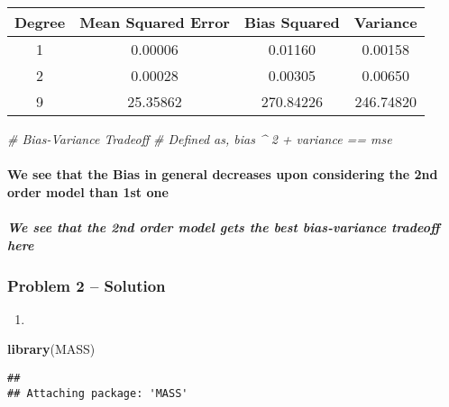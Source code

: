 \documentclass[]{article}
\newenvironment{Shaded}{\begin{snugshade}}{\end{snugshade}}
\newcommand{\CommentTok}[1]{\textcolor[rgb]{0.56,0.35,0.01}{\textit{#1}}}
\newcommand{\KeywordTok}[1]{\textcolor[rgb]{0.13,0.29,0.53}{\textbf{#1}}}
\newcommand{\NormalTok}[1]{#1}
\let\oldparagraph\paragraph
\renewcommand{\paragraph}[1]{\oldparagraph{#1}\mbox{}}
\let\oldsubparagraph\subparagraph
\renewcommand{\subparagraph}[1]{\oldsubparagraph{#1}\mbox{}}
\begin{document}
\begin{longtable}[]{@{}cccc@{}}
\toprule
Degree & Mean Squared Error & Bias Squared & Variance\tabularnewline
\midrule
\endhead
1 & 0.00006 & 0.01160 & 0.00158\tabularnewline
2 & 0.00028 & 0.00305 & 0.00650\tabularnewline
9 & 25.35862 & 270.84226 & 246.74820\tabularnewline
\bottomrule
\end{longtable}

\begin{Shaded}
\begin{Highlighting}[]
\CommentTok{# Bias-Variance Tradeoff}
\CommentTok{# Defined as, bias ^ 2 + variance == mse}
\end{Highlighting}
\end{Shaded}

\hypertarget{we-see-that-the-bias-in-general-decreases-upon-considering-the-2nd-order-model-than-1st-one}{%
\paragraph{We see that the Bias in general decreases upon considering
the 2nd order model than 1st
one}\label{we-see-that-the-bias-in-general-decreases-upon-considering-the-2nd-order-model-than-1st-one}}

\hypertarget{we-see-that-the-2nd-order-model-gets-the-best-bias-variance-tradeoff-here}{%
\subparagraph{We see that the 2nd order model gets the best
bias-variance tradeoff
here}\label{we-see-that-the-2nd-order-model-gets-the-best-bias-variance-tradeoff-here}}

\hypertarget{problem-2-solution}{%
\subsubsection{Problem 2 -- Solution}\label{problem-2-solution}}

\begin{enumerate}
\def\labelenumi{(\alph{enumi})}
\item
\end{enumerate}

\begin{Shaded}
\begin{Highlighting}[]
\KeywordTok{library}\NormalTok{(MASS)}
\end{Highlighting}
\end{Shaded}

\begin{verbatim}
## 
## Attaching package: 'MASS'
\end{verbatim}
\end{document}
